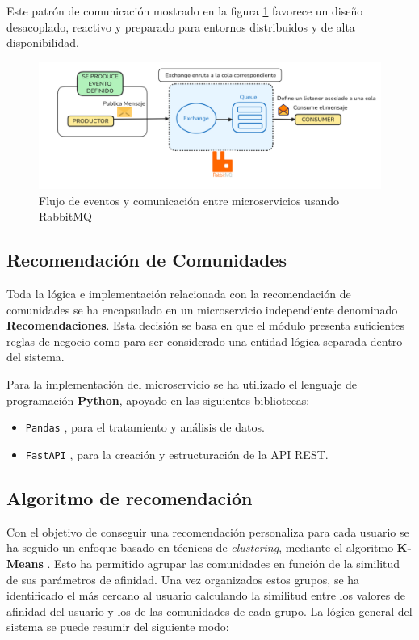 Este patrón de comunicación mostrado en la figura \ref{fig:RabbitMQexpl} favorece un diseño desacoplado, reactivo y preparado para entornos distribuidos y de alta disponibilidad.

\begin{figure}[h!]
  \centering
  \includegraphics[width=1\textwidth]{fotos/RabbitMQexpl.png}
  \caption{Flujo de eventos y comunicación entre microservicios usando RabbitMQ}
  \label{fig:RabbitMQexpl}
\end{figure}
\subsection{Recomendación de Comunidades}

Toda la lógica e implementación relacionada con la recomendación de comunidades se ha encapsulado en un microservicio independiente denominado \textbf{Recomendaciones}. Esta decisión se basa en que el módulo presenta suficientes reglas de negocio como para ser considerado una entidad lógica separada dentro del sistema.

\vspace{0.5em}
Para la implementación del microservicio se ha utilizado el lenguaje de programación \textbf{Python}, apoyado en las siguientes bibliotecas:

\begin{itemize}
    \item \texttt{Pandas} \cite{pandas}, para el tratamiento y análisis de datos.
    \item \texttt{FastAPI} \cite{fastapi}, para la creación y estructuración de la API REST.
\end{itemize}

\subsection*{Algoritmo de recomendación}

Con el objetivo de conseguir una recomendación personaliza para cada usuario se ha seguido un enfoque basado en técnicas de \textit{clustering}, mediante el algoritmo \textbf{K-Means} \cite{kmeans}. Esto ha permitido agrupar las comunidades en función de la similitud de sus parámetros de afinidad. Una vez organizados estos grupos, se ha identificado el más cercano al usuario calculando la similitud entre los valores de afinidad del usuario y los de las comunidades de cada grupo. La lógica general del sistema se puede resumir del siguiente modo:


